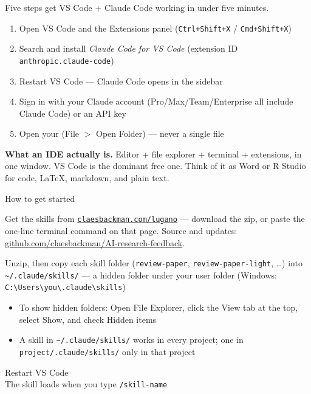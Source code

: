 \documentclass[aspectratio=169, 10pt]{beamer}
\begin{document}
\begin{frame}{Five steps get VS Code + Claude Code working in under five minutes.}
\vskip0.2cm
\begin{enumerate}
  \item Open VS Code and the Extensions panel (\texttt{Ctrl+Shift+X} / \texttt{Cmd+Shift+X})
  \item Search  and install \emph{Claude Code for VS Code} (extension ID \texttt{anthropic.claude-code})
  \item Restart VS Code --- Claude Code opens in the sidebar
  \item Sign in with your Claude account (Pro/Max/Team/Enterprise all include Claude Code) or an API key
  \item Open your  (File $>$ Open Folder) --- never a single file
\end{enumerate}

\vskip0.3cm
\textbf{What an IDE actually is.} Editor + file explorer + terminal + extensions, in one window. VS Code is the dominant free one. Think of it as Word or R Studio for code, LaTeX, markdown, and plain text.

\end{frame}


\begin{frame}{How to get started}

  Get the skills from \href{https://claesbackman.com/lugano}{\texttt{claesbackman.com/lugano}} --- download the zip, or paste the one-line terminal command on that page. Source and updates: \href{https://github.com/claesbackman/AI-research-feedback}{github.com/claesbackman/AI-research-feedback}. \\
  \bigskip 

  Unzip, then copy each skill folder (\texttt{review-paper}, \texttt{review-paper-light}, \ldots) into \texttt{\textasciitilde/.claude/skills/} --- a hidden folder under your user folder (Windows: \texttt{C:\textbackslash Users\textbackslash you\textbackslash .claude\textbackslash skills})
  \begin{itemize}
    \item To show hidden folders: Open File Explorer, click the View tab at the top, select Show, and check Hidden items
    \item A skill in \texttt{\textasciitilde/.claude/skills/} works in every project; one in \texttt{project/.claude/skills/} only in that project
  \end{itemize}
  \bigskip
  Restart VS Code\\
    \bigskip
  The skill loads when you type \texttt{/skill-name}
\end{frame}
\end{document}
